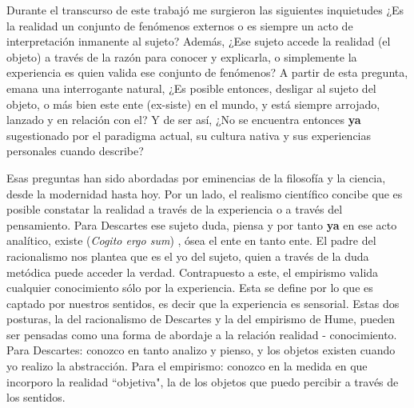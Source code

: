 Durante el transcurso de este trabajó me surgieron las siguientes inquietudes ¿Es la realidad un conjunto de fenómenos externos o es siempre un acto de interpretación inmanente al sujeto? Además, ¿Ese sujeto accede la realidad (el objeto) a través de la razón para conocer y explicarla, o simplemente la experiencia es quien valida ese conjunto de fenómenos? A partir de esta pregunta, emana una interrogante natural, ¿Es posible entonces, desligar al sujeto del objeto, o más bien este ente (ex-siste) en el mundo, y está siempre arrojado, lanzado y en relación con el? Y de ser así, ¿No se encuentra entonces \textbf{ya} sugestionado por el paradigma actual, su cultura nativa y sus experiencias personales cuando describe?

Esas preguntas han sido abordadas por eminencias de la filosofía y la ciencia, desde la modernidad hasta hoy. Por un lado, el realismo científico concibe que es posible constatar la realidad a través de la experiencia o a través del pensamiento. Para Descartes ese sujeto duda, piensa y por tanto \textbf{ya} en ese acto analítico, existe (\emph{Cogito ergo sum}) \cite{descartes2004discurso}, ósea el ente en tanto ente. El padre del racionalismo nos plantea que es el yo del sujeto, quien a través de la duda metódica puede acceder la verdad. Contrapuesto a este, el empirismo valida cualquier conocimiento sólo por la experiencia. Esta se define por lo que es captado por nuestros sentidos, es decir que la experiencia es sensorial. Estas dos posturas, la del racionalismo de Descartes y la del empirismo de Hume, pueden ser pensadas como una forma de abordaje a la relación realidad - conocimiento. Para Descartes: conozco en tanto analizo y pienso, y los objetos existen cuando yo realizo la abstracción. Para el empirismo: conozco en la medida en que incorporo la realidad ``objetiva", la de los objetos que puedo percibir a través de los sentidos. 

